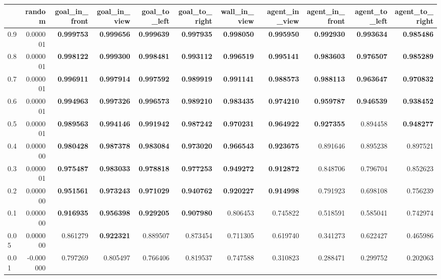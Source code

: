 \begin{tabular}{lrrrrrrrrrr}
\toprule
 & random & goal\_in\_front & goal\_in\_view & goal\_to\_left & goal\_to\_right & wall\_in\_view & agent\_in\_view & agent\_in\_front & agent\_to\_left & agent\_to\_right \\
\midrule
0.9 & 0.000001 & \bfseries 0.999753 & \bfseries 0.999656 & \bfseries 0.999639 & \bfseries 0.997935 & \bfseries 0.998050 & \bfseries 0.995950 & \bfseries 0.992930 & \bfseries 0.993634 & \bfseries 0.985486 \\
0.8 & 0.000001 & \bfseries 0.998122 & \bfseries 0.999300 & \bfseries 0.998481 & \bfseries 0.993112 & \bfseries 0.996519 & \bfseries 0.995141 & \bfseries 0.983603 & \bfseries 0.976507 & \bfseries 0.985289 \\
0.7 & 0.000001 & \bfseries 0.996911 & \bfseries 0.997914 & \bfseries 0.997592 & \bfseries 0.989919 & \bfseries 0.991141 & \bfseries 0.988573 & \bfseries 0.988113 & \bfseries 0.963647 & \bfseries 0.970832 \\
0.6 & 0.000001 & \bfseries 0.994963 & \bfseries 0.997326 & \bfseries 0.996573 & \bfseries 0.989210 & \bfseries 0.983435 & \bfseries 0.974210 & \bfseries 0.959787 & \bfseries 0.946539 & \bfseries 0.938452 \\
0.5 & 0.000001 & \bfseries 0.989563 & \bfseries 0.994146 & \bfseries 0.991942 & \bfseries 0.987242 & \bfseries 0.970231 & \bfseries 0.964922 & \bfseries 0.927355 & 0.894458 & \bfseries 0.948277 \\
0.4 & 0.000000 & \bfseries 0.980428 & \bfseries 0.987378 & \bfseries 0.983084 & \bfseries 0.973020 & \bfseries 0.966543 & \bfseries 0.923675 & 0.891646 & 0.895238 & 0.897521 \\
0.3 & 0.000001 & \bfseries 0.975487 & \bfseries 0.983033 & \bfseries 0.978818 & \bfseries 0.977253 & \bfseries 0.949272 & \bfseries 0.912872 & 0.848706 & 0.796704 & 0.852623 \\
0.2 & 0.000000 & \bfseries 0.951561 & \bfseries 0.973243 & \bfseries 0.971029 & \bfseries 0.940762 & \bfseries 0.920227 & \bfseries 0.914998 & 0.791923 & 0.698108 & 0.756239 \\
0.1 & 0.000000 & \bfseries 0.916935 & \bfseries 0.956398 & \bfseries 0.929205 & \bfseries 0.907980 & 0.806453 & 0.745822 & 0.518591 & 0.585041 & 0.742974 \\
0.05 & 0.000000 & 0.861279 & \bfseries 0.922321 & 0.889507 & 0.873454 & 0.711305 & 0.619740 & 0.341273 & 0.622427 & 0.465986 \\
0.01 & -0.000000 & 0.797269 & 0.805497 & 0.766406 & 0.819537 & 0.747588 & 0.310823 & 0.288471 & 0.299752 & 0.202063 \\
\bottomrule
\end{tabular}